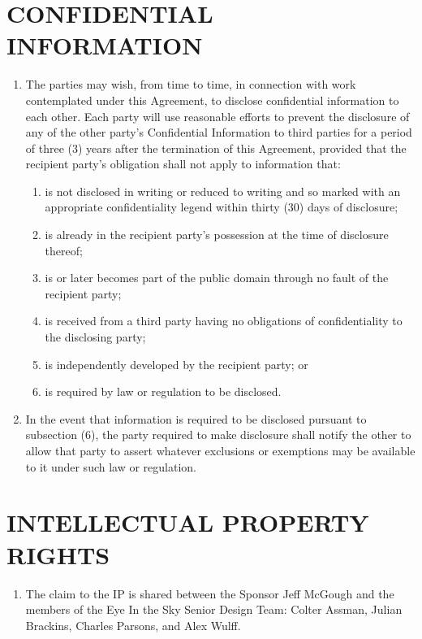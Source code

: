 \section{CONFIDENTIAL INFORMATION }    
\begin{enumerate}  \itemsep4pt \parskip0pt 
\item The parties may wish, from time to time, in connection with work       contemplated under this Agreement, to disclose confidential       information to each other. Each party       will use reasonable efforts to prevent the disclosure of any of       the other party's Confidential Information to third parties for a       period of three (3) years after the termination of this Agreement,       provided that the recipient party's obligation shall not apply to       information that:               
\begin{enumerate}  \itemsep4pt \parskip0pt 
\item  is not disclosed in writing or reduced to writing and so                 marked with an appropriate confidentiality legend within                 thirty (30) days of disclosure;              
\item is already in the recipient party's possession at the                 time of disclosure thereof;              
\item  is or later becomes part of the public domain through no                 fault of the recipient party;              
\item  is received from a third party having no obligations of                 confidentiality to the disclosing party;              
\item is independently developed by the recipient party; or              
\item is required by law or regulation to be disclosed.     
\end{enumerate}
\item In the event that information is required to be disclosed pursuant       to subsection (6), the party required to make disclosure shall       notify the other to allow that party to assert whatever exclusions       or exemptions may be available to it under such law or regulation.  
\end{enumerate}


\section{INTELLECTUAL PROPERTY RIGHTS } 
\begin{enumerate}  \itemsep4pt \parskip0pt 
\item[] The claim to the IP is shared between the Sponsor Jeff McGough and the members of the Eye In the Sky Senior Design Team:  Colter Assman, Julian Brackins, Charles Parsons, and Alex Wulff.
\end{enumerate}


